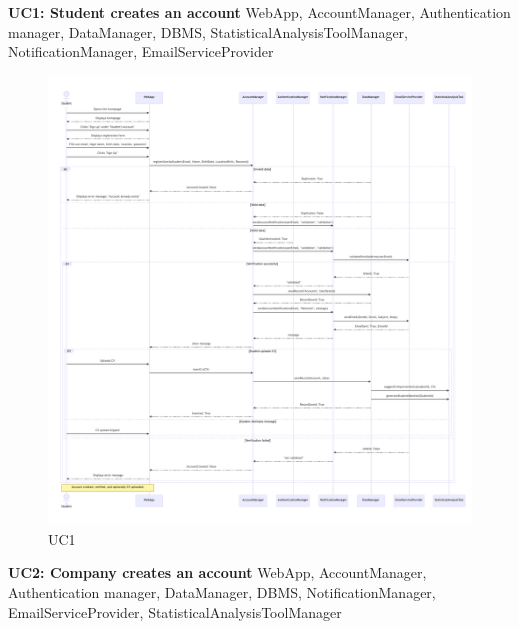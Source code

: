 \newpage
\textbf{UC1: Student creates an account}
WebApp, AccountManager, Authentication manager, DataManager, DBMS, StatisticalAnalysisToolManager, NotificationManager, EmailServiceProvider



\begin{figure}[H]
    \centering
    \includegraphics[width=1.1\linewidth]{DD//Images/SequenceDiagrams/UC1.pdf}
    \caption{UC1}
\end{figure}

\newpage
\textbf{UC2: Company creates an account}
WebApp, AccountManager, Authentication manager, DataManager, DBMS, NotificationManager, EmailServiceProvider, StatisticalAnalysisToolManager



